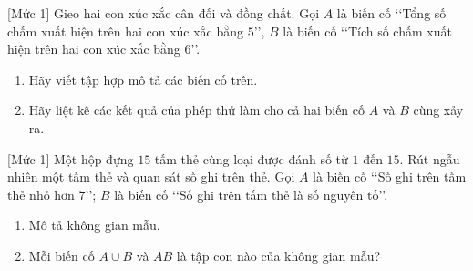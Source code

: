 \begin{bt}%
[Mức 1]
	Gieo hai con xúc xắc cân đối và đồng chất. Gọi $A$ là biến cố \lq\lq Tổng số chấm xuất hiện trên hai con xúc xắc bằng $5$\rq\rq, $B$ là biến cố \lq\lq Tích số chấm xuất hiện trên hai con xúc xắc bằng $6$\rq\rq.
	\begin{enumerate}
		\item Hãy viết tập hợp mô tả các biến cố trên.
		\item Hãy liệt kê các kết quả của phép thử làm cho cả hai biến cố $A$ và $B$ cùng xảy ra.
	\end{enumerate}
\end{bt}

\begin{bt}%
[Mức 1]
	Một hộp đựng $15$ tấm thẻ cùng loại được đánh số từ $1$ đến $15$. Rút ngẫu nhiên một tấm thẻ và quan sát số ghi trên thẻ. Gọi $A$ là biến cố \lq\lq Số ghi trên tấm thẻ nhỏ hơn $7$\rq\rq; $B$ là biến cố \lq\lq Số ghi trên tấm thẻ là số nguyên tố\rq\rq.
	\begin{enumerate}
		\item Mô tả không gian mẫu.
		\item Mỗi biến cố $A \cup B$ và $AB$ là tập con nào của không gian mẫu?
	\end{enumerate}
\end{bt}

